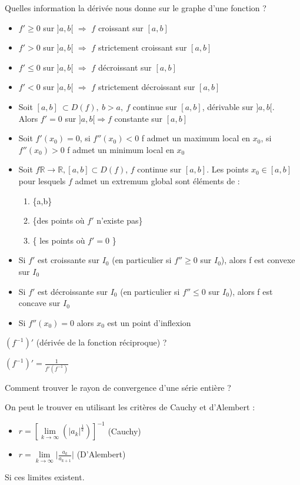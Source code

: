 \documentclass[12pt]{article}
\newcommand*{\xfield}[1]{\begin{mdframed}\centering #1\end{mdframed}\bigskip}
\newenvironment{note}{}{}
\begin{document}
\begin{note}
	\xfield{Quelles information la dérivée nous donne sur le graphe d'une fonction ?}
	\xfield{\begin{itemize}
		\item $f' \ge 0$ sur $]a,b[$ $\Rightarrow$ $f$ croissant sur $[a,b]$
		\item $f' > 0$ sur $]a,b[$ $\Rightarrow$ $f$ strictement croissant sur $[a,b]$
		\item $f' \le 0$ sur $]a,b[$ $\Rightarrow$ $f$ décroissant sur $[a,b]$
		\item $f' < 0$ sur $]a,b[$ $\Rightarrow$ $f$ strictement décroissant sur $[a,b]$
		\item Soit $[a,b]\ \subset D(f),\ b > a,\ f$ continue sur $[a,b]$, dérivable sur $]a,b[$.\\
		Alors $f'=0$ sur $]a,b[ \Rightarrow f$ constante sur $[a,b]$
		\item Soit $f'(x_0)=0$, si $f''(x_0)<0$ f admet un maximum local en $x_0$,
		si $f''(x_0)>0$ f admet un minimum local en $x_0$
		\item Soit $f \mathbb{R} \to \mathbb{R}, [a,b] \subset D(f)$, $f$ continue sur $[a,b]$. Les points $x_0 \in [a,b]$ pour lesquels $f$ admet un extremum global sont éléments de : \begin{enumerate}
			\item \{a,b\}
			\item \{des points où $f'$ n'existe pas\}
			\item \{ les points où $f'=0$ \}
		\end{enumerate}
		\item Si $f'$ est croissante sur $I_0$ (en particulier si $f'' \ge 0$ sur $I_0$), alors f est convexe sur $I_0$
		\item Si $f'$ est décroissante sur $I_0$ (en particulier si $f'' \le 0$ sur $I_0$), alors f est concave sur $I_0$ 
		\item Si $f''(x_0) = 0$ alors $x_0$ est un point d'inflexion
	\end{itemize} }
\end{note}

\begin{note}
	\xfield{$(f^{-1})'$ (dérivée de la fonction réciproque) ?}
	\xfield{$(f^{-1})' =  \frac{1}{f'(f^{-1})}$}
\end{note}

\begin{note}
	\xfield{Comment trouver le rayon de convergence d'une série entière ?}
	\xfield{On peut le trouver en utilisant les critères de Cauchy et d'Alembert :\begin{itemize}
	\item $r = \left[ \lim\limits_{k \to \infty} (\vert a_k \vert^{\frac{1}{k}})\right]^{-1}$ (Cauchy)
	\item $r=  \lim\limits_{k \to \infty} \big| \frac{a_k}{a_{k+1}}\big|$ (D'Alembert)
	\end{itemize}
	 Si ces limites existent.}
\end{note}
\end{document}
